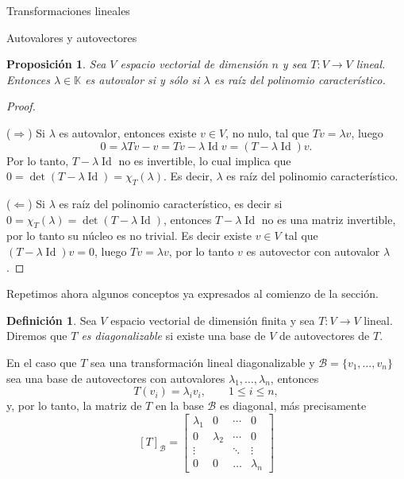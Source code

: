 \documentclass[a4paper,12pt,twoside,spanish,reqno]{amsbook}
\newtheorem{proposicion}[teorema]{Proposici\'on}
\theoremstyle{definition}
\newtheorem{definicion}{Definici\'on}[section]
\theoremstyle{remark}
\newcommand{\Id}{\operatorname{Id}}
\newcommand{\K}{\mathbb K}
\begin{document}
\begin{chapter}{Transformaciones lineales}
\begin{section}{Autovalores y autovectores}
    

        
        \begin{proposicion}\label{autovalores}
            Sea $V$ espacio vectorial de dimensión $n$ y sea $T: V \to V$ lineal. Entonces $\lambda\in \K$ es autovalor si y sólo si $\lambda$ es raíz del polinomio característico.  
        \end{proposicion}
        \begin{proof}${}^{}$
            
            ($\Rightarrow$) Si $\lambda$ es autovalor, entonces existe $v \in V$, no nulo, tal que $Tv = \lambda v$, luego 
            $$
            0 = \lambda Tv -v  =   Tv - \lambda \Id v =  (T-\lambda \Id)v.
            $$
            Por lo tanto, $T-\lambda \Id$ no es invertible, lo cual implica que $0 = \det(T-\lambda \Id) = \chi_T(\lambda)$. Es decir, $\lambda$ es raíz del polinomio característico. 
            
            ($\Leftarrow$) Si $\lambda$ es raíz del polinomio característico, es decir si $0 = \chi_T(\lambda) = \det(T-\lambda \Id)$, entonces $T-\lambda \Id$ no es una matriz invertible, por lo tanto  su núcleo es no trivial. Es decir existe $v \in V$ tal que $(T-\lambda \Id)v =0$, luego $Tv =\lambda v$, por lo tanto $v$ es autovector con autovalor $\lambda$.   
        \end{proof}
        
        Repetimos ahora algunos conceptos ya expresados al comienzo de la sección. 
        
        \begin{definicion}
            Sea $V$ espacio vectorial de dimensión finita y sea $T: V \to V$ lineal. Diremos que \textit{$T$ es diagonalizable} si existe una base de $V$ de autovectores de $T$. 
        \end{definicion}	
        
        En el caso que $T$ sea una transformación lineal diagonalizable y $\mathcal{B} = \{v_1,\ldots,v_n \}$ sea una base de autovectores con autovalores $\lambda_1,\ldots,\lambda_n$, entonces
        $$
        T(v_i) = \lambda_i v_i, \qquad 1 \le i \le n,
        $$ 
        y, por lo tanto, la matriz de $T$ en  la base $\mathcal{B}$ es diagonal, más precisamente
        $$
        [T]_\mathcal{B} = \begin{bmatrix}
        \lambda_1 &0 & \cdots & 0 \\
        0 & \lambda_2 & \cdots &0 \\
        \vdots & &\ddots & \vdots \\
        0 & 0 & \ldots &\lambda_n
        \end{bmatrix}
        $$
        

\end{section}
\end{chapter}
\end{document}
